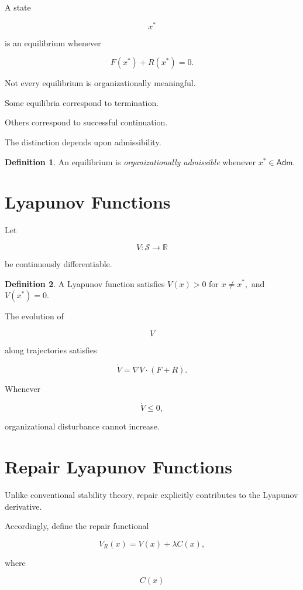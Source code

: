\documentclass[11pt,oneside]{book}
\numberwithin{equation}{chapter}
\theoremstyle{definition}
\newtheorem{definition}{Definition}[chapter]
\theoremstyle{plain}
\newcommand{\Adm}{\mathsf{Adm}}
\begin{document}
A state

\[
x^\ast
\]

is an equilibrium whenever

\[
F(x^\ast)
+
R(x^\ast)
=
0.
\]

Not every equilibrium is organizationally meaningful.

Some equilibria correspond to termination.

Others correspond to successful continuation.

The distinction depends upon admissibility.

\begin{definition}
An equilibrium is \emph{organizationally admissible} whenever
\(
x^\ast
\in
\Adm.
\)
\end{definition}

\section{Lyapunov Functions}

Let

\[
V
:
\mathcal S
\rightarrow
\mathbb R
\]

be continuously differentiable.

\begin{definition}
A Lyapunov function satisfies
\(
V(x)
>
0
\)
for
\(
x
\neq
x^\ast,
\)
and
\(
V(x^\ast)
=
0.
\)
\end{definition}

The evolution of

\[
V
\]

along trajectories satisfies

\[
\dot V
=
\nabla V
\cdot
(F+R).
\]

Whenever

\[
\dot V
\le
0,
\]

organizational disturbance cannot increase.

\section{Repair Lyapunov Functions}

Unlike conventional stability theory, repair explicitly contributes to the
Lyapunov derivative.

Accordingly, define the repair functional

\[
V_R(x)
=
V(x)
+
\lambda
C(x),
\]

where

\[
C(x)
\]
\end{document}

